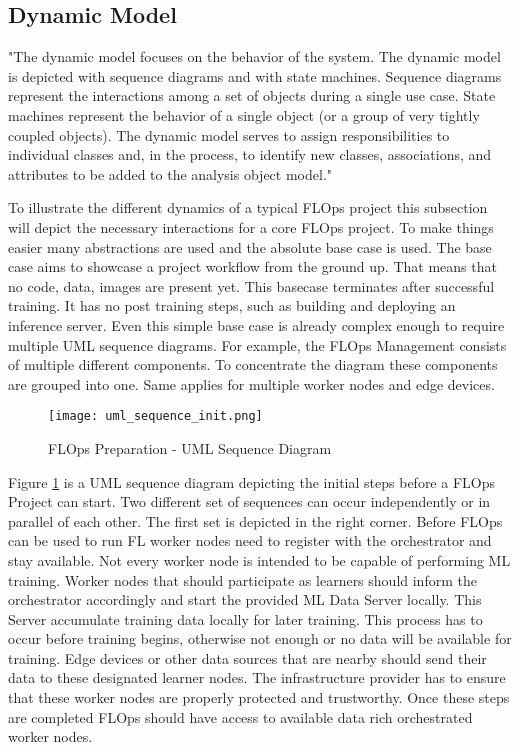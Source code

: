 \subsection{Dynamic Model}
"The dynamic model focuses on the behavior of the system. The dynamic model is
depicted with sequence diagrams and with state machines. Sequence diagrams represent the
interactions among a set of objects during a single use case. State machines represent the
behavior of a single object (or a group of very tightly coupled objects). The dynamic model
serves to assign responsibilities to individual classes and, in the process, to identify new classes,
associations, and attributes to be added to the analysis object model."

To illustrate the different dynamics of a typical FLOps project this subsection will depict the necessary interactions for a core FLOps project.
To make things easier many abstractions are used and the absolute base case is used.
The base case aims to showcase a project workflow from the ground up.
That means that no code, data, images are present yet.
This basecase terminates after successful training.
It has no post training steps, such as building and deploying an inference server.
Even this simple base case is already complex enough to require multiple UML sequence diagrams.
For example, the FLOps Management consists of multiple different components.
To concentrate the diagram these components are grouped into one.
Same applies for multiple worker nodes and edge devices.

\begin{figure}[h]
    \begin{adjustwidth}{-0.2\paperwidth}{-0.2\paperwidth}
        \centering
        \texttt{[image: uml\_sequence\_init.png]}
        \caption{FLOps Preparation - UML Sequence Diagram}
        \label{fig:uml_sequence_init}
    \end{adjustwidth}
\end{figure}

Figure \ref{fig:uml_sequence_init} is a UML sequence diagram depicting the initial steps before a FLOps Project can start.
Two different set of sequences can occur independently or in parallel of each other.
The first set is depicted in the right corner.
Before FLOps can be used to run FL worker nodes need to register with the orchestrator and stay available.
Not every worker node is intended to be capable of performing ML training.
Worker nodes that should participate as learners should inform the orchestrator accordingly and start the provided ML Data Server locally.
This Server accumulate training data locally for later training.
This process has to occur before training begins, otherwise not enough or no data will be available for training.
Edge devices or other data sources that are nearby should send their data to these designated learner nodes.
The infrastructure provider has to ensure that these worker nodes are properly protected and trustworthy.
Once these steps are completed FLOps should have access to available data rich orchestrated worker nodes.

